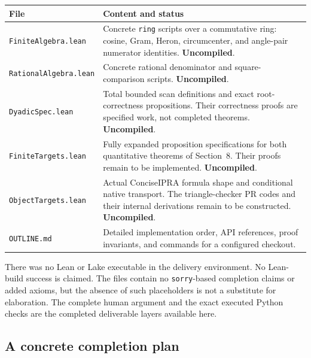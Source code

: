 \documentclass[11pt,a4paper]{article}
\theoremstyle{definition}
\newcommand{\code}[1]{\texttt{\small #1}}
\numberwithin{equation}{section}
\begin{document}
\begin{center}
\renewcommand{\arraystretch}{1.15}
\begin{tabular}{@{}p{43mm}p{88mm}@{}}
\toprule
File & Content and status\\
\midrule
\code{FiniteAlgebra.lean} &
Concrete \code{ring} scripts over a commutative ring: cosine, Gram,
Heron, circumcenter, and angle-pair numerator identities.
\textbf{Uncompiled}.\\
\code{RationalAlgebra.lean} &
Concrete rational denominator and square-comparison scripts.
\textbf{Uncompiled}.\\
\code{DyadicSpec.lean} &
Total bounded scan definitions and exact root-correctness
propositions. Their correctness proofs are specified work,
not completed theorems. \textbf{Uncompiled}.\\
\code{FiniteTargets.lean} &
Fully expanded proposition specifications for both quantitative
theorems of Section~8. Their proofs remain to be implemented.
\textbf{Uncompiled}.\\
\code{ObjectTargets.lean} &
Actual ConciseIPRA formula shape and conditional native transport.
The triangle-checker PR codes and their internal derivations
remain to be constructed. \textbf{Uncompiled}.\\
\code{OUTLINE.md} &
Detailed implementation order, API references, proof invariants,
and commands for a configured checkout.\\
\bottomrule
\end{tabular}
\end{center}

There was no Lean or Lake executable in the delivery environment.
No Lean-build success is claimed. The files contain no
\code{sorry}-based completion claims or added axioms, but the
absence of such placeholders is not a substitute for elaboration.
The complete human argument and the exact executed Python checks
are the completed deliverable layers available here.

\subsection{A concrete completion plan}
\end{document}
